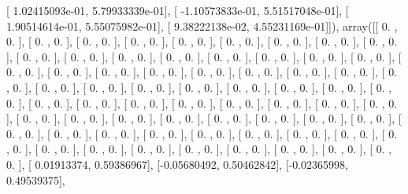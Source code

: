 \documentclass{article}
\begin{document}
       [  1.02415093e-01,   5.79933339e-01],
       [ -1.10573833e-01,   5.51517048e-01],
       [  1.90514614e-01,   5.55075982e-01],
       [  9.38222138e-02,   4.55231169e-01]]), array([[ 0.        ,  0.        ],
       [ 0.        ,  0.        ],
       [ 0.        ,  0.        ],
       [ 0.        ,  0.        ],
       [ 0.        ,  0.        ],
       [ 0.        ,  0.        ],
       [ 0.        ,  0.        ],
       [ 0.        ,  0.        ],
       [ 0.        ,  0.        ],
       [ 0.        ,  0.        ],
       [ 0.        ,  0.        ],
       [ 0.        ,  0.        ],
       [ 0.        ,  0.        ],
       [ 0.        ,  0.        ],
       [ 0.        ,  0.        ],
       [ 0.        ,  0.        ],
       [ 0.        ,  0.        ],
       [ 0.        ,  0.        ],
       [ 0.        ,  0.        ],
       [ 0.        ,  0.        ],
       [ 0.        ,  0.        ],
       [ 0.        ,  0.        ],
       [ 0.        ,  0.        ],
       [ 0.        ,  0.        ],
       [ 0.        ,  0.        ],
       [ 0.        ,  0.        ],
       [ 0.        ,  0.        ],
       [ 0.        ,  0.        ],
       [ 0.        ,  0.        ],
       [ 0.        ,  0.        ],
       [ 0.        ,  0.        ],
       [ 0.        ,  0.        ],
       [ 0.        ,  0.        ],
       [ 0.        ,  0.        ],
       [ 0.        ,  0.        ],
       [ 0.        ,  0.        ],
       [ 0.        ,  0.        ],
       [ 0.        ,  0.        ],
       [ 0.        ,  0.        ],
       [ 0.        ,  0.        ],
       [ 0.        ,  0.        ],
       [ 0.        ,  0.        ],
       [ 0.        ,  0.        ],
       [ 0.        ,  0.        ],
       [ 0.        ,  0.        ],
       [ 0.        ,  0.        ],
       [ 0.        ,  0.        ],
       [ 0.        ,  0.        ],
       [ 0.        ,  0.        ],
       [ 0.        ,  0.        ],
       [ 0.        ,  0.        ],
       [ 0.        ,  0.        ],
       [ 0.        ,  0.        ],
       [ 0.        ,  0.        ],
       [ 0.        ,  0.        ],
       [ 0.        ,  0.        ],
       [ 0.        ,  0.        ],
       [ 0.        ,  0.        ],
       [ 0.        ,  0.        ],
       [ 0.        ,  0.        ],
       [ 0.        ,  0.        ],
       [ 0.        ,  0.        ],
       [ 0.        ,  0.        ],
       [ 0.        ,  0.        ],
       [ 0.        ,  0.        ],
       [ 0.        ,  0.        ],
       [ 0.        ,  0.        ],
       [ 0.01913374,  0.59386967],
       [-0.05680492,  0.50462842],
       [-0.02365998,  0.49539375],
\end{document}
